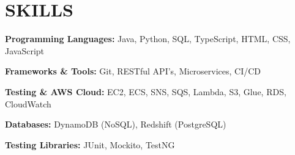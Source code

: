     \section{SKILLS}

        \begin{onecolentry}
            \textbf{Programming Languages:} Java, Python, SQL, TypeScript, HTML, CSS, JavaScript
        \end{onecolentry}

        \vspace{0.1 cm}

        \begin{onecolentry}
            \textbf{Frameworks \& Tools:} Git, RESTful API's, Microservices, CI/CD 
        \end{onecolentry}

        \vspace{0.1 cm}

        \begin{onecolentry}
            \textbf{Testing \& AWS Cloud:} EC2, ECS, SNS, SQS, Lambda, S3, Glue, RDS, CloudWatch
        \end{onecolentry}

        \vspace{0.1 cm}

        \begin{onecolentry}
            \textbf{Databases:} DynamoDB \small{(NoSQL)}, Redshift \small{(PostgreSQL)}
        \end{onecolentry}

        \vspace{0.1 cm}
        
        \begin{onecolentry}
            \textbf{Testing Libraries:} JUnit, Mockito, TestNG
        \end{onecolentry}